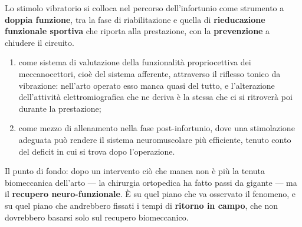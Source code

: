 Lo stimolo vibratorio si colloca nel percorso dell'infortunio come strumento a \textbf{doppia
funzione}, tra la fase di riabilitazione e quella di \textbf{rieducazione funzionale sportiva} che
riporta alla prestazione, con la \textbf{prevenzione} a chiudere il circuito.
\begin{enumerate}
  \item come sistema di valutazione della funzionalità propriocettiva dei meccanocettori, cioè del
    sistema afferente, attraverso il riflesso tonico da vibrazione: nell'arto operato esso manca
    quasi del tutto, e l'alterazione dell'attività elettromiografica che ne deriva è la stessa che
    ci si ritroverà poi durante la prestazione;
  \item come mezzo di allenamento nella fase post-infortunio, dove una stimolazione adeguata può
    rendere il sistema neuromuscolare più efficiente, tenuto conto del deficit in cui si trova dopo
    l'operazione.
\end{enumerate}
Il punto di fondo: dopo un intervento ciò che manca non è più la tenuta biomeccanica dell'arto ---
la chirurgia ortopedica ha fatto passi da gigante --- ma il \textbf{recupero neuro-funzionale}. È su
quel piano che va osservato il fenomeno, e su quel piano che andrebbero fissati i tempi di
\textbf{ritorno in campo}, che non dovrebbero basarsi solo sul recupero biomeccanico.
